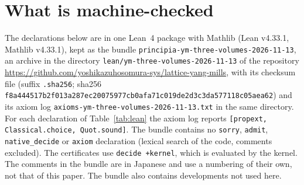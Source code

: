 \documentclass[11pt,a4paper]{article}
\theoremstyle{definition}
\theoremstyle{remark}
\newcommand{\code}[1]{\texttt{#1}}
\begin{document}
\section{What is machine-checked}\label{sec:lean}

{\sloppy The declarations below are in one Lean~4 package with Mathlib (Lean v4.33.1, Mathlib v4.33.1), kept as the bundle \code{principia-ym-three-volumes-2026-11-13}, an archive in the directory \code{lean/\allowbreak{}ym-three-volumes-2026-11-13} of the repository \url{https://github.com/yoshikazuhosomura-sys/lattice-yang-mills}, with its checksum file (suffix \code{.sha256}; sha256 \texttt{f8a44451\allowbreak{}7b2f013a\allowbreak{}287ec200\allowbreak{}75977cb0\allowbreak{}afa71c01\allowbreak{}9de2d3c3\allowbreak{}da577118\allowbreak{}c05aea62}) and its axiom log \code{axioms-\allowbreak{}ym-three-volumes-\allowbreak{}2026-11-13.txt} in the same directory. For each declaration of Table~\ref{tab:lean} the axiom log reports \code{[propext, Classical.choice, Quot.sound]}. The bundle contains no \code{sorry}, \code{admit}, \code{native\_decide} or \code{axiom} declaration (lexical search of the code, comments excluded). The certificates use \code{decide +kernel}, which is evaluated by the kernel. The comments in the bundle are in Japanese and use a numbering of their own, not that of this paper. The bundle also contains developments not used here.\par}
\end{document}
